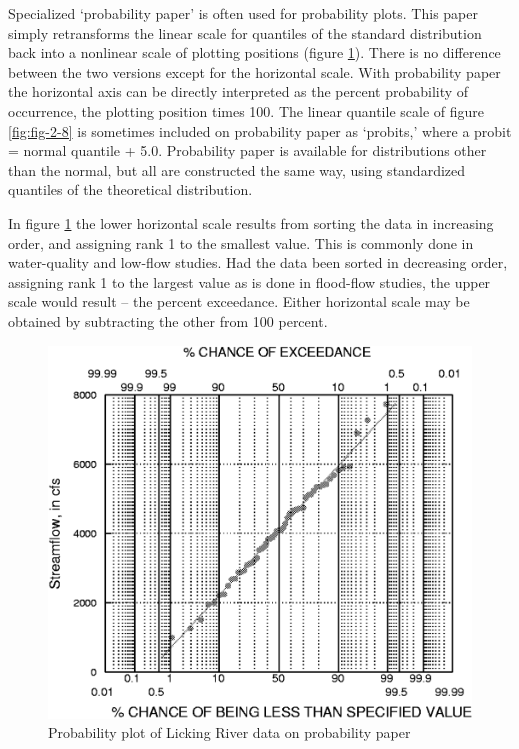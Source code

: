 \documentclass[]{book}
\begin{document}
Specialized `probability paper' is often used for probability plots. This paper simply retransforms the linear scale for quantiles of the standard distribution back into a nonlinear scale of plotting positions (figure \ref{fig:fig-2-9}). There is no difference between the two versions except for the horizontal scale. With probability paper the horizontal axis can be directly interpreted as the percent probability of occurrence, the plotting position times 100. The linear quantile scale of figure \ref{fig:fig-2-8} is sometimes included on probability paper as `probits,' where a probit = normal quantile + 5.0. Probability paper is available for distributions other than the normal, but all are constructed the same way, using standardized quantiles of the theoretical distribution.

In figure \ref{fig:fig-2-9} the lower horizontal scale results from sorting the data in increasing order, and assigning rank 1 to the smallest value. This is commonly done in water-quality and low-flow studies. Had the data been sorted in decreasing order, assigning rank 1 to the largest value as is done in flood-flow studies, the upper scale would result -- the percent exceedance. Either horizontal scale may be obtained by subtracting the other from 100 percent.

\begin{figure}

{\centering \includegraphics[width=13.82in]{figures/2_9} 

}

\caption{Probability plot of Licking River data on probability paper}\label{fig:fig-2-9}
\end{figure}
\end{document}
